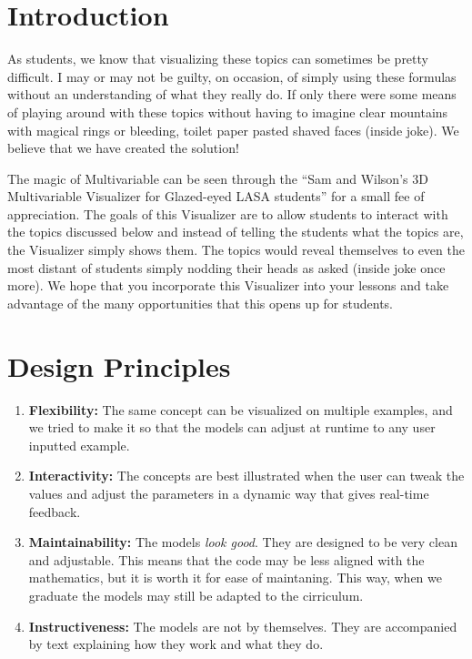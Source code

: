 \documentclass[12pt,letterpaper,english]{article}
\begin{document}
\tableofcontents

\clearpage

\doublespacing

\section{Introduction}

 As students, we know that visualizing these topics can sometimes be pretty difficult. I may or may not be guilty, on occasion, of simply using these formulas without an understanding of what they really do. If only there were some means of playing around with these topics without having to imagine clear mountains with magical rings or bleeding, toilet paper pasted shaved faces (inside joke). We believe that we have created the solution!

 The magic of Multivariable can be seen through the “Sam and Wilson’s 3D Multivariable Visualizer for Glazed-eyed LASA students” for a small fee of appreciation. The goals of this Visualizer are to allow students to interact with the topics discussed below and instead of telling the students  what the topics are, the Visualizer simply shows them. The topics would reveal themselves to even the most distant of students simply nodding their heads as asked (inside joke once more). We hope that you incorporate this Visualizer into your lessons and take advantage of the many opportunities that this opens up for students.

\section{Design Principles}

\begin{enumerate}
\item \textbf{Flexibility:} The same concept can be visualized on multiple examples, and we tried to make it so that the models can adjust at runtime to any user inputted example.
\item \textbf{Interactivity:} The concepts are best illustrated when the user can tweak the values and adjust the parameters in a dynamic way that gives real-time feedback.
\item \textbf{Maintainability:} The models \textit{look good}. They are designed to be very clean and adjustable. This means that the code may be less aligned with the mathematics, but it is worth it for ease of maintaning. This way, when we graduate the models may still be adapted to the cirriculum.
\item \textbf{Instructiveness:} The models are not by themselves. They are accompanied by text %
explaining how they work and what they do.
\end{enumerate}
\end{document}
